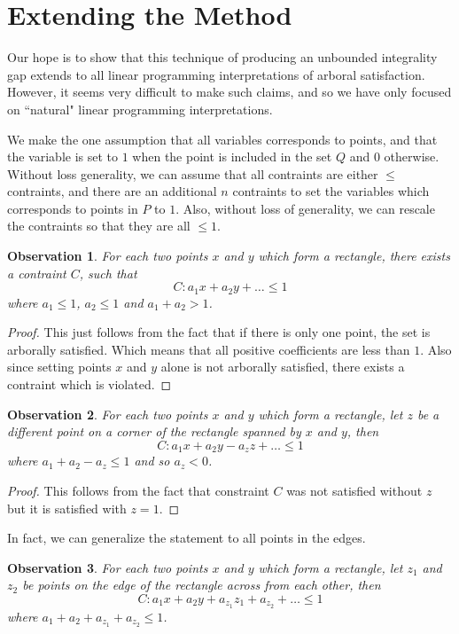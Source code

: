 \documentclass[11pt]{article}
\newtheorem{observation}{Observation}
\begin{document}
\section{Extending the Method}

Our hope is to show that this technique of producing an unbounded integrality gap extends to all linear programming interpretations of arboral satisfaction. However, it seems very difficult to make such claims, and so we have only focused on ``natural" linear programming interpretations.

We make the one assumption that all variables corresponds to points, and that the variable is set to $1$ when the point is included in the set $Q$ and $0$ otherwise. Without loss generality, we can assume that all contraints are either $\leq$ contraints, and there are an additional $n$ contraints to set the variables which corresponds to points in $P$ to $1$. Also, without loss of generality, we can rescale the contraints so that they are all $\leq 1$. 

\begin{observation}
For each two points $x$ and $y$ which form a rectangle, there exists a contraint $C$, such that
\[ C: a_1x + a_2y + \dots \leq 1 \]
where $a_1 \leq 1$, $a_2 \leq 1$ and $a_1 + a_2 > 1$. 
\end{observation}

\begin{proof}
This just follows from the fact that if there is only one point, the set is arborally satisfied. Which means that all positive coefficients are less than $1$. Also since setting points $x$ and $y$ alone is not arborally satisfied, there exists a contraint which is violated.
\end{proof}

\begin{observation}
For each two points $x$ and $y$ which form a rectangle, let $z$ be a different point on a corner of the rectangle spanned by $x$ and $y$, then
\[ C: a_1x + a_2y - a_zz + \dots \leq 1 \]
where $a_1 + a_2 - a_z \leq 1$ and so $a_z < 0$.
\end{observation}

\begin{proof}
This follows from the fact that constraint $C$ was not satisfied without $z$ but it is satisfied with $z = 1$. 
\end{proof}

In fact, we can generalize the statement to all points in the edges.
\begin{observation}
For each two points $x$ and $y$ which form a rectangle, let $z_1$ and $z_2$ be points on the edge of the rectangle across from each other, then
\[ C : a_1x + a_2y + a_{z_1}z_1 + a_{z_2} + \dots \leq 1\]
where $a_1 + a_2 + a_{z_1} + a_{z_2} \leq 1$. 
\end{observation}
\end{document}
